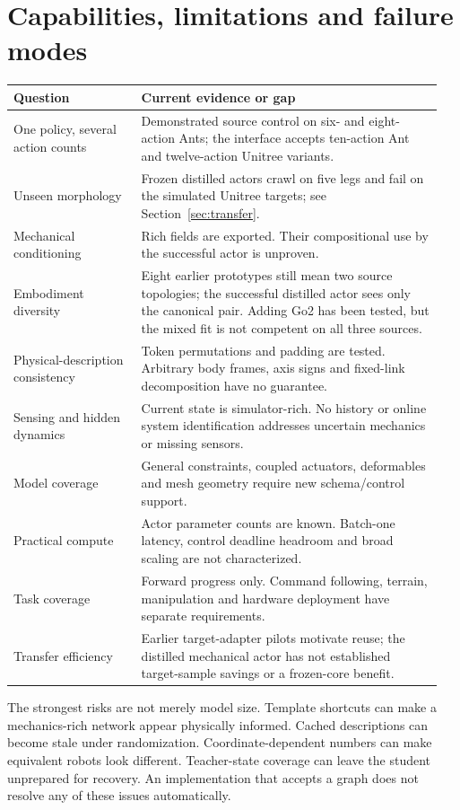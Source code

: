 \documentclass[11pt,letterpaper]{article}
\begin{document}
\FloatBarrier
\section{Capabilities, limitations and failure modes}
\label{sec:gaps}

\begin{longtable}{@{}p{0.29\linewidth}p{0.66\linewidth}@{}}
\toprule
Question & Current evidence or gap\\
\midrule
\endhead
One policy, several action counts & Demonstrated source control on six- and
eight-action Ants; the interface accepts ten-action Ant and twelve-action Unitree variants.\\
Unseen morphology & Frozen distilled actors crawl on five legs and fail on the
simulated Unitree targets; see Section~\ref{sec:transfer}.\\
Mechanical conditioning & Rich fields are exported. Their compositional use by
the successful actor is unproven.\\
Embodiment diversity & Eight earlier prototypes still mean two source topologies;
the successful distilled actor sees only the canonical pair. Adding Go2 has been
tested, but the mixed fit is not competent on all three sources.\\
Physical-description consistency & Token permutations and padding are tested.
Arbitrary body frames, axis signs and fixed-link decomposition have no guarantee.\\
Sensing and hidden dynamics & Current state is simulator-rich. No history or
online system identification addresses uncertain mechanics or missing sensors.\\
Model coverage & General constraints, coupled actuators, deformables and mesh
geometry require new schema/control support.\\
Practical compute & Actor parameter counts are known. Batch-one latency, control
deadline headroom and broad scaling are not characterized.\\
Task coverage & Forward progress only. Command following, terrain, manipulation
and hardware deployment have separate requirements.\\
Transfer efficiency & Earlier target-adapter pilots motivate reuse; the distilled
mechanical actor has not established target-sample savings or a frozen-core benefit.\\
\bottomrule
\end{longtable}

The strongest risks are not merely model size. Template shortcuts can make a
mechanics-rich network appear physically informed. Cached descriptions can become
stale under randomization. Coordinate-dependent numbers can make equivalent
robots look different. Teacher-state coverage can leave the student unprepared
for recovery. An implementation that accepts a graph does not resolve any of
these issues automatically.
\end{document}
